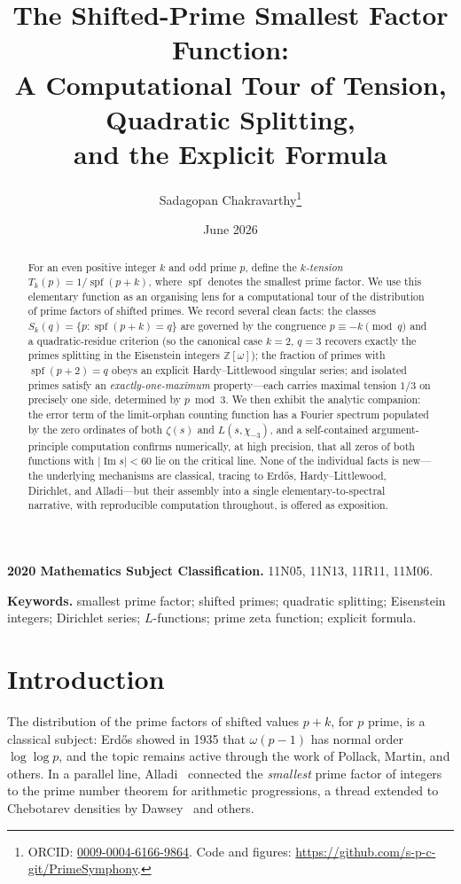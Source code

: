 \documentclass[11pt]{article}
\title{\textbf{The Shifted-Prime Smallest Factor Function:\\
A Computational Tour of Tension, Quadratic Splitting,\\
and the Explicit Formula}}
\author{Sadagopan Chakravarthy\thanks{
ORCID: \href{https://orcid.org/0009-0004-6166-9864}{0009-0004-6166-9864}.
Code and figures:
\url{https://github.com/s-p-c-git/PrimeSymphony}.}}
\date{June 2026}
\theoremstyle{plain}
\theoremstyle{definition}
\theoremstyle{remark}
\newcommand{\spf}{\operatorname{spf}}
\newcommand{\Z}{\mathbb{Z}}
\newcommand{\im}{\operatorname{Im}}
\begin{document}
\maketitle

\begin{abstract}
For an even positive integer $k$ and odd prime $p$, define the \emph{$k$-tension}
$T_k(p) = 1/\spf(p+k)$, where $\spf$ denotes the smallest prime factor. We use
this elementary function as an organising lens for a computational tour of the
distribution of prime factors of shifted primes. We record several clean facts:
the classes $S_k(q)=\{p : \spf(p+k)=q\}$ are governed by the congruence
$p\equiv -k \pmod q$ and a quadratic-residue criterion (so the canonical case
$k=2$, $q=3$ recovers exactly the primes splitting in the Eisenstein integers
$\Z[\omega]$); the fraction of primes with $\spf(p+2)=q$ obeys an explicit
Hardy--Littlewood singular series; and isolated primes satisfy an
\emph{exactly-one-maximum} property---each carries maximal tension $1/3$ on
precisely one side, determined by $p \bmod 3$. We then exhibit the analytic
companion: the error term of the limit-orphan counting function has a Fourier
spectrum populated by the zero ordinates of both $\zeta(s)$ and $L(s,\chi_{-3})$,
and a self-contained argument-principle computation confirms numerically, at
high precision, that all zeros of both functions with $|\im s|<60$ lie on the
critical line. None of the
individual facts is new---the underlying mechanisms are classical, tracing to
Erd\H{o}s, Hardy--Littlewood, Dirichlet, and Alladi---but their
assembly into a single elementary-to-spectral narrative, with reproducible
computation throughout, is offered as exposition.
\end{abstract}

\noindent\textbf{2020 Mathematics Subject Classification.} 11N05, 11N13, 11R11, 11M06.

\noindent\textbf{Keywords.} smallest prime factor; shifted primes; quadratic
splitting; Eisenstein integers; Dirichlet series; $L$-functions; prime zeta
function; explicit formula.

\section{Introduction}

The distribution of the prime factors of shifted values $p+k$, for $p$ prime, is
a classical subject: Erd\H{o}s showed in 1935 that $\omega(p-1)$ has normal order
$\log\log p$, and the topic remains active through the work of Pollack, Martin,
and others. In a parallel line, Alladi~\cite{Alladi1977} connected the
\emph{smallest} prime factor of integers to the prime number theorem for
arithmetic progressions, a thread extended to Chebotarev densities by
Dawsey~\cite{Dawsey2017} and others.
\end{document}
